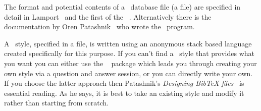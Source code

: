     The format and potential contents of a \Pbibtex\
database file 
(a  file) are specified in detail in Lamport~\cite{LAMPORT94} 
and the first of the \btitle{Companions}~\cite{COMPANION}. 
Alternatively
there is the documentation by Oren Patashnik~\cite{BIBTEX} who wrote the
\Lbibtex\ program.


    A \Pbibtex\ style, specified in a  file, is written 
using an anonymous stack based language
created specifically for this purpose. If you can't find a 
\Pbibtex\ style
that provides what you want you can either use the 
~\cite{MAKEBST} package
which leads you through creating your own style via a question and answer
session, or you can directly write your own. If you choose the latter
approach then Patashnik's \textit{Designing BibTeX files}~\cite{BIBTEXHACK}
is essential reading. As he says, it is best to take an existing style and
modify it rather than starting from scratch. 

